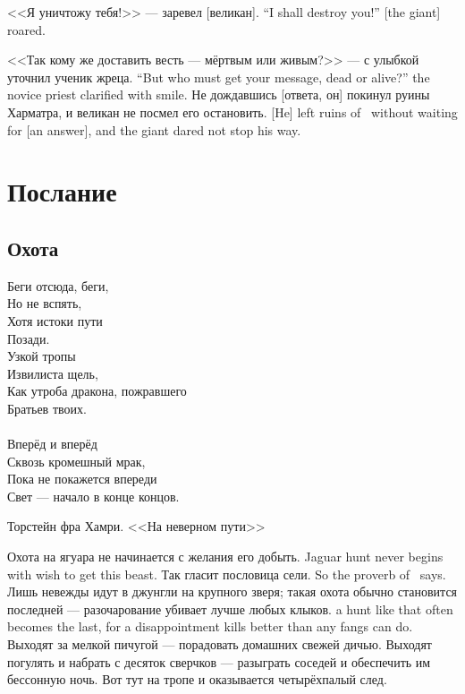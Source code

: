 {<<Я уничтожу тебя!>> --- заревел [великан].}
{``I shall destroy you!'' [the giant] roared.}

{<<Так кому же доставить весть --- мёртвым или живым?>> --- с улыбкой уточнил ученик жреца.}
{``But who must get your message, dead or alive?'' the novice priest clarified with smile.}
{Не дождавшись [ответа, он] покинул руины Харматра, и великан не посмел его остановить.}
{[He] left ruins of \Harrmatr\ without waiting for [an answer], and the giant dared not stop his way.}

\chapter{Послание}

\section{Охота}


\epigraph
{Беги отсюда, беги,\\
Но не вспять,\\
Хотя истоки пути\\
Позади.\\
Узкой тропы\\
Извилиста щель,\\
Как утроба дракона, пожравшего\\
Братьев твоих.\\
~\\
Вперёд и вперёд\\
Сквозь кромешный мрак,\\
Пока не покажется впереди\\
Свет --- начало в конце концов.}
{Торстейн фра Хамри.
<<На неверном пути>>}

{Охота на ягуара не начинается с желания его добыть.}
{Jaguar hunt never begins with wish to get this beast.}
{Так гласит пословица сели.}
{So the proverb of \Seli\ says.}
Лишь невежды идут в джунгли на крупного зверя;
{такая охота обычно становится последней --- разочарование убивает лучше любых клыков.}
{a hunt like that often becomes the last, for a disappointment kills better than any fangs can do.}
Выходят за мелкой пичугой --- порадовать домашних свежей дичью.
Выходят погулять и набрать с десяток сверчков --- разыграть соседей и обеспечить им бессонную ночь.
Вот тут на тропе и оказывается четырёхпалый след.

